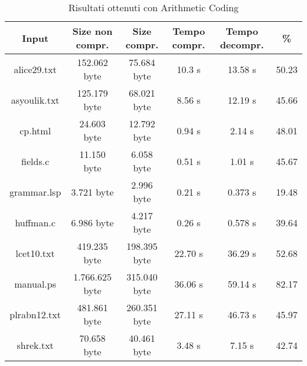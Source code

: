     \begin{table}
    \begin{tabular}{||c c c c c c||} 
     \hline
     Input & Size non compr. & Size compr. & Tempo compr. & Tempo decompr. & \% \\ [0.5ex] 
     \hline\hline
     alice29.txt & 152.062 byte & 75.684 byte & 10.3 s & 13.58 s & 50.23\\ [1ex]
     \hline
     asyoulik.txt & 125.179 byte & 68.021 byte & 8.56 s & 12.19 s & 45.66\\ [1ex] 
     \hline
     cp.html & 24.603 byte & 12.792 byte & 0.94 s & 2.14 s & 48.01\\ [1ex] 
     \hline
     fields.c & 11.150 byte & 6.058 byte & 0.51 s & 1.01 s & 45.67\\ [1ex]
     \hline
     grammar.lsp & 3.721 byte & 2.996 byte & 0.21 s & 0.373 s & 19.48\\ [1ex] 
     \hline
     huffman.c & 6.986 byte & 4.217 byte & 0.26 s & 0.578 s & 39.64\\ [1ex]
     \hline
     lcet10.txt & 419.235 byte & 198.395 byte & 22.70 s & 36.29 s & 52.68\\ [1ex] 
     \hline
     manual.ps & 1.766.625 byte & 315.040 byte & 36.06 s & 59.14 s & 82.17\\ 
 [1ex]
     \hline
     plrabn12.txt & 481.861 byte & 260.351 byte & 27.11 s & 46.73 s & 45.97\\ [1ex] 
     \hline
     shrek.txt & 70.658 byte & 40.461 byte & 3.48 s & 7.15 s & 42.74\\ [1ex]

     \hline
    \end{tabular} 
    \caption{Risultati ottenuti con Arithmetic Coding\label{tab:ac}}
    \end{table}

